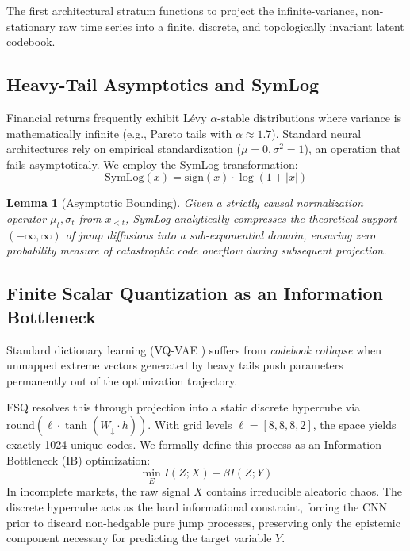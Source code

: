 \documentclass[11pt]{article}
\newtheorem{lemma}[theorem]{Lemma}
\begin{document}
The first architectural stratum functions to project the infinite-variance, non-stationary raw time series into a finite, discrete, and topologically invariant latent codebook.

\subsection{Heavy-Tail Asymptotics and SymLog}
Financial returns frequently exhibit L\'evy $\alpha$-stable distributions where variance is mathematically infinite (e.g., Pareto tails with $\alpha \approx 1.7$). Standard neural architectures rely on empirical standardization ($\mu=0, \sigma^2=1$), an operation that fails asymptoticaly. We employ the SymLog transformation:
\begin{equation}
  \text{SymLog}(x) = \text{sign}(x) \cdot \log(1 + |x|)
\end{equation}
\begin{lemma}[Asymptotic Bounding]
Given a strictly causal normalization operator $\mu_t, \sigma_t$ from $x_{<t}$, SymLog analytically compresses the theoretical support $(-\infty, \infty)$ of jump diffusions into a sub-exponential domain, ensuring zero probability measure of catastrophic code overflow during subsequent projection.
\end{lemma}

\subsection{Finite Scalar Quantization as an Information Bottleneck}
Standard dictionary learning (VQ-VAE \cite{oord2017vqvae}) suffers from \textit{codebook collapse} when unmapped extreme vectors generated by heavy tails push parameters permanently out of the optimization trajectory. 

FSQ \cite{mentzer2023fsq} resolves this through projection into a static discrete hypercube via $\text{round}\left(\ell \cdot \tanh(W_\downarrow \cdot h)\right)$. With grid levels $\ell = [8, 8, 8, 2]$, the space yields exactly 1024 unique codes.
We formally define this process as an Information Bottleneck (IB) optimization:
\begin{equation}
    \min_{E} I(Z; X) - \beta I(Z; Y)
\end{equation}
In incomplete markets, the raw signal $X$ contains irreducible aleatoric chaos. The discrete hypercube acts as the hard informational constraint, forcing the CNN prior to discard non-hedgable pure jump processes, preserving only the epistemic component necessary for predicting the target variable $Y$. 
\end{document}
